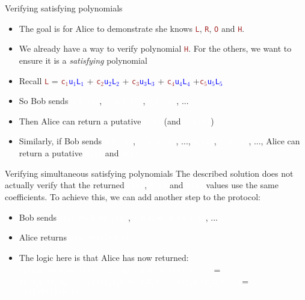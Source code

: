 \documentclass[dvipsnames]{beamer}
\newcommand{\pub}[1]{\textcolor{blue}{\texttt{#1}}}
\newcommand{\priv}[1]{\textcolor{brown}{\texttt{#1}}}
\newcommand{\enc}[1]{\colorbox{SkyBlue!75}{\textcolor{white}{\texttt{#1}}}}
\begin{document}
    \begin{frame}{Verifying satisfying polynomials}
        \begin{itemize}
            \item The goal is for Alice to demonstrate she knows \priv{L}, \priv{R}, \priv{O} and \priv{H}.
            \item We already have a way to verify polynomial \priv{H}. For the others, we want to ensure it is a \textit{satisfying} polynomial
            \item Recall \priv{L} = \priv{c$_1$}\pub{u$_1$L$_1$} + \priv{c$_2$}\pub{u$_2$L$_2$} + \priv{c$_3$}\pub{u$_3$L$_3$} + \priv{c$_4$}\pub{u$_4$L$_4$} +\priv{c$_5$}\pub{u$_5$L$_5$}
            \item So Bob sends \enc{u$_1$L$_1$(s)}, \enc{$\beta\cdot$u$_1$L$_1$(s)}, \enc{u$_2$L$_2$(s)}, ...
            \item Then Alice can return a putative \enc{L(s)} (and \enc{$\beta\cdot$L(s)})
            \item Similarly, if Bob sends \enc{v$_1$R$_1$(s)}, \enc{$\gamma\cdot$v$_1$R$_1$(s)}, ..., \enc{O$_1$(s)}, \enc{$\delta\cdot$O$_1$(s)}, ..., Alice can return a putative \enc{R(s)} and \enc{O(s)}
        \end{itemize}
    \end{frame}

    \begin{frame}{Verifying simultaneous satisfying polynomials}
        The described solution does not actually verify that the returned \enc{L(s)}, \enc{R(s)} and \enc{O(s)} values use the same coefficients. To achieve this, we can add another step to the protocol:
        \begin{itemize}
            \item Bob sends \enc{(u$_1$L$_1$+v$_1$R$_1$+O$_1$)(s)}, \enc{$\epsilon$\cdot(u$_1$L$_1$+v$_1$R$_1$+O$_1$)(s)}, ...
            \item Alice returns \enc{L(s)+R(s)+O(s)}
            \item The logic here is that Alice has now returned:\\
            \enc{c$_1$(u$_1$L$_1$+v$_1$R$_1$+O$_1$)(s) + c$_2$(u$_2$L$_2$+u$_2$R$_2$+O$_2$)(s) + ...} = \\
            \enc{(c$_1$u$_1$L$_1$+c$_2$u$_2$L$_2$+...)+(c$_1$v$_1$R$_1$+c$_2$v$_2$R$_2$+...)+(c$_1$O$_1$+c$_2$O$_2$+...)}=\\
            \enc{L(s)+R(s)+O(s)}
        \end{itemize}
    \end{frame}
\end{document}
